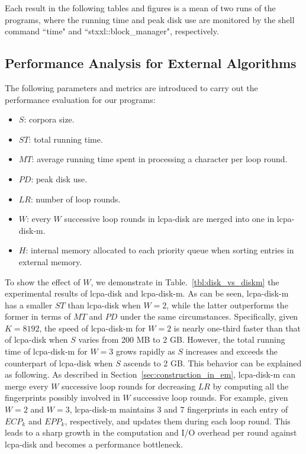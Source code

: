 \documentclass[10pt,journal,compsoc]{IEEEtran}
\begin{document}
\begin{CJK*}{GBK}{song}
Each result in the following tables and figures is a mean of two runs of the programs, where the running time and peak disk use are monitored by the shell command ``time" and ``stxxl::block\_manager", respectively.

\subsection{Performance Analysis for External Algorithms}

The following parameters and metrics are introduced to carry out the performance evaluation for our programs:
\begin{itemize}
\item $S$: corpora size.
\item $ST$: total running time.
\item $MT$: average running time spent in processing a character per loop round.
\item $PD$: peak disk use.
\item $LR$: number of loop rounds.
\item $W$: every $W$ successive loop rounds in lcpa-disk are merged into one in lcpa-disk-m.
\item $H$: internal memory allocated to each priority queue when sorting entries in external memory.
\end{itemize}

To show the effect of $W$, we demonstrate in Table.~\ref{tbl:disk_vs_diskm} the experimental results of lcpa-disk and lcpa-disk-m. As can be seen, lcpa-disk-m has a smaller $ST$ than lcpa-disk when $W=2$, while the latter outperforms the former in terms of $MT$ and $PD$ under the same circumstances. Specifically, given $K=8192$, the speed of lcpa-disk-m for $W=2$ is nearly one-third faster than that of lcpa-disk when $S$ varies from 200 MB to 2 GB. However, the total running time of lcpa-disk-m for $W=3$ grows rapidly as $S$ increases and exceeds the counterpart of lcpa-disk when $S$ ascends to 2 GB. This behavior can be explained as following. As described in Section~\ref{sec:construction_in_em}, lcpa-disk-m can merge every $W$ successive loop rounds for decreasing $LR$ by computing all the fingerprints possibly involved in $W$ successive loop rounds. For example, given $W=2$ and $W=3$, lcpa-disk-m maintains 3 and 7 fingerprints in each entry of $ECP_k$ and $EPP_k$, respectively, and updates them during each loop round. This leads to a sharp growth in the computation and I/O overhead per round against lcpa-disk and becomes a performance bottleneck.


\end{CJK*}
\end{document}
